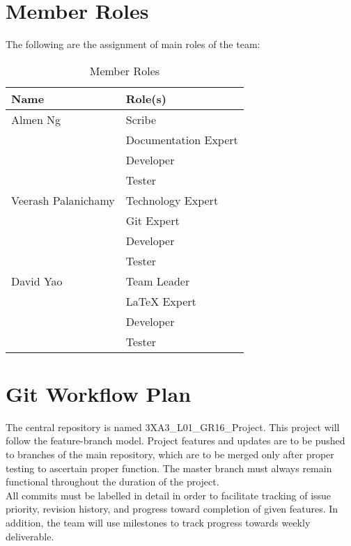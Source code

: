 \documentclass[12pt,letterpaper]{article}
\begin{document}
\section{Member Roles}
The following are the assignment of main roles of the team:

\begin{table}[hbt!]
    \centering
    \begin{tabularx}{\textwidth}{|X|X|}
        \toprule
        \textbf{Name} & \textbf{Role(s)}\\
        \midrule
        Almen Ng                    & Scribe\\
                                    & Documentation Expert\\
                                    & Developer\\
                                    & Tester\\
        Veerash Palanichamy         & Technology Expert\\
                                    & Git Expert\\
                                    & Developer\\
                                    & Tester\\
        David Yao                   & Team Leader\\
                                    & LaTeX Expert\\
                                    & Developer\\
                                    & Tester\\
        \bottomrule
    \end{tabularx}
\caption{Member Roles} \label{tab:memberRoles}
\end{table}

\newpage

\section{Git Workflow Plan}
The central repository is named 3XA3\_L01\_GR16\_Project. This project will follow the feature-branch model. Project features and updates are to be pushed to branches of the main repository, which are to be merged only after proper testing to ascertain proper function. The master branch must always remain functional throughout the duration of the project.\\
All commits must be labelled in detail in order to facilitate tracking of issue priority, revision history, and progress toward completion of given features. In addition, the team will use milestones to track progress towards weekly deliverable.
\end{document}

